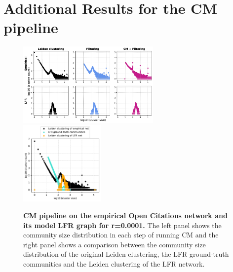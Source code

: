 \documentclass[a4paper]{article}   	%
\begin{document}
\section{Additional Results for the CM pipeline}

\begin{figure}[h!]
\centering
\includegraphics[width=0.62\textwidth]{figs/oc_cm_steps_lfr0001.pdf}
\includegraphics[width=0.37\textwidth]{figs/oc_0001_cm_size.pdf}
\caption[CM pipeline on the empirical Open Citations network and its model LFR graph for r=0.0001]{\textbf{CM pipeline on the empirical Open Citations network and its model LFR graph for r=0.0001.} The left panel shows the community size distribution in each step of running CM and the right panel shows a comparison between the community size distribution of the original Leiden clustering, the LFR ground-truth communities and the Leiden clustering of the LFR network.}
\label{fig:oc-cm-lfr-0001}
\end{figure}
\end{document}

